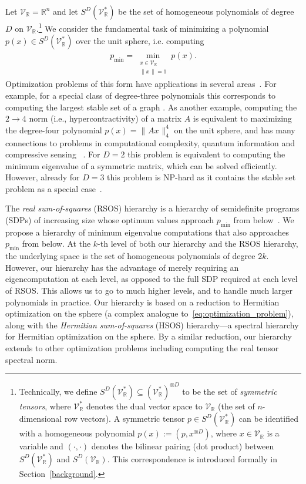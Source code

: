 \documentclass[11pt]{article}
\numberwithin{theorem}{section}
\theoremstyle{definition}
\newcommand{\tinyspace}{\mspace{1mu}}
\newcommand{\norm}[1]{\lVert\tinyspace #1 \tinyspace\rVert}
\newcommand{\real}{\mathbb{R}}
\newcommand\V{\mathcal{V}}
\newcommand\Sp{\mathcal{S}}
\newcommand{\Vr}{\V_{\real}}
\begin{document}
Let $\Vr=\real^n$ and let $S^D(\Vr^*)$ be the set of homogeneous polynomials of degree $D$ on $\Vr$.\footnote{Technically, we define $S^D(\Vr^*)\subseteq (\Vr^*)^{\otimes D}$ to be the set of \textit{symmetric tensors}, where $\Vr^*$ denotes the dual vector space to $\Vr$ (the set of $n$-dimensional row vectors). A symmetric tensor $p \in S^D(\Vr^*)$ can be identified with a homogeneous polynomial $p(x):=(p,x^{\otimes D})$, where $x\in \Vr$ is a variable and $(\cdot, \cdot)$ denotes the bilinear pairing (dot product) between $S^D(\Vr^*)$ and $S^D(\Vr)$. This correspondence is introduced formally in Section~\ref{background}.\label{f1}} We consider the fundamental task of minimizing a polynomial ${p(x) \in S^D(\Vr^*)}$ over the unit sphere, i.e. computing
\begin{align}\label{eq:optimization_problem}
p_{\min}=\min_{\substack{x \in \Vr\\ \norm{x}=1}} p(x).
        \end{align}
Optimization problems of this form have applications in several areas~\cite{fang2021sum}. For example, for a special class of degree-three polynomials this corresponds to computing the largest stable set of a graph \cite{nesterov2003random,de2008complexity}. As another example, computing the $2 \rightarrow 4$ norm (i.e., hypercontractivity) of a matrix $A$ is equivalent to maximizing the degree-four polynomial $p(x)=\norm{Ax}_4^4$ on the unit sphere, and has many connections to problems in computational complexity, quantum information and compressive sensing ~\cite{barak2012hypercontractivity}. For $D=2$ this problem is equivalent to computing the minimum eigenvalue of a symmetric matrix, which can be solved efficiently. However, already for $D=3$ this problem is NP-hard as it contains the stable set problem as a special case~\cite{nesterov2003random}.

The \textit{real sum-of-squares} (RSOS) hierarchy is a hierarchy of semidefinite programs (SDPs) of increasing size whose optimum values approach $p_{\min}$ from below~\cite{reznick1995uniform,lasserre2001global}. We propose a hierarchy of minimum eigenvalue computations that also approaches $p_{\min}$ from below. At the $k$-th level of both our hierarchy and the RSOS hierarchy, the underlying space is the set of homogeneous polynomials of degree $2k$. However, our hierarchy has the advantage of merely requiring an eigencomputation at each level,
as opposed to the full SDP required at each level of RSOS. This allows us to go to much higher levels, and to handle much larger polynomials in practice. Our hierarchy is based on a reduction to {Hermitian} optimization on the sphere (a complex analogue to~\eqref{eq:optimization_problem}), along with the \textit{Hermitian sum-of-squares} (HSOS) hierarchy---a spectral hierarchy for Hermitian optimization on the sphere. By a similar reduction, our hierarchy extends to other optimization problems including computing the real tensor spectral norm.
\end{document}
